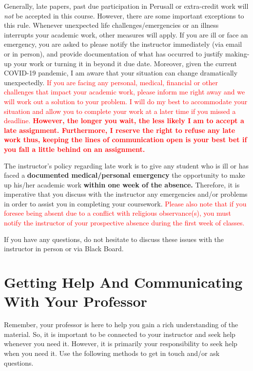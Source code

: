 \documentclass[11pt,]{article}
\begin{document}
Generally, late papers, past due participation in Perusall or
extra-credit work will \emph{not} be accepted in this course. However,
there are some important exceptions to this rule. Whenever unexpected
life challenges/emergencies or an illness interrupts your academic work,
other measures will apply. If you are ill or face an emergency, you are
asked to please notify the instructor immediately (via email or in
person), and provide documentation of what has occurred to justify
making-up your work or turning it in beyond it due date. Moreover, given
the current COVID-19 pandemic, I am aware that your situation can change
dramatically unexpectedly.
\textcolor{red}{If you are facing any personal, medical, financial or other challenges that impact your academic work, please inform me right away and we will work out a solution to your problem. I will do my best to accommodate your situation and allow you to complete your work at a later time if you missed a deadline.}
\textbf{\textcolor{red}{However, the longer you wait, the less likely I am to accept a late assignment. Furthermore, I reserve the right to refuse any late work thus, keeping the lines of communication open is your best bet if you fall a little behind on an assignment.}}

The instructor's policy regarding late work is to give any student who
is ill or has faced a \textbf{documented medical/personal emergency} the
opportunity to make up his/her academic work \textbf{within one week of
the absence.} Therefore, it is imperative that you discuss with the
instructor any emergencies and/or problems in order to assist you in
completing your coursework.
\textcolor{red}{Please also note that if you foresee being absent due to a conflict with religious observance(s), you must notify the instructor of your prospective absence during the first week of classes.}

If you have any questions, do not hesitate to discuss these issues with
the instructor in person or via Black Board.

\hypertarget{getting-help-and-communicating-with-your-professor}{%
\section{Getting Help And Communicating With Your
Professor}\label{getting-help-and-communicating-with-your-professor}}

Remember, your professor is here to help you gain a rich understanding
of the material. So, it is important to be connected to your instructor
and seek help whenever you need it. However, it is primarily your
responsibility to seek help when you need it. Use the following methods
to get in touch and/or ask questions.
\end{document}
